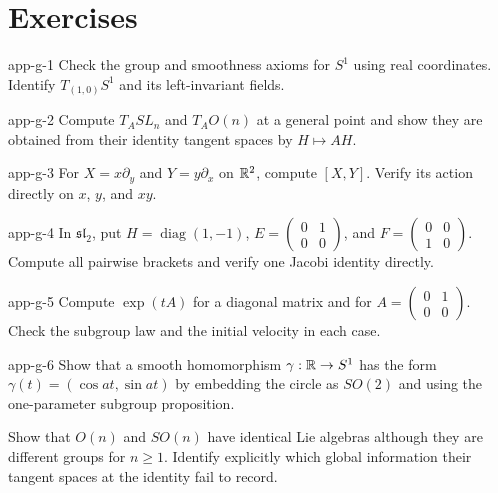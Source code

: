 \section*{Exercises}
\begin{hexercise}{app-g-1}
Check the group and smoothness axioms for $S^1$ using real coordinates.
Identify $T_{(1,0)}S^1$ and its left-invariant fields.
\end{hexercise}
\begin{hexercise}{app-g-2}
Compute $T_ASL_n$ and $T_AO(n)$ at a general point and show they are
obtained from their identity tangent spaces by $H\mapsto AH$.
\end{hexercise}
\begin{hexercise}{app-g-3}
For $X=x\partial_y$ and $Y=y\partial_x$ on $\mathbb{R}^2$, compute $[X,Y]$.
Verify its action directly on $x$, $y$, and $xy$.
\end{hexercise}
\begin{hexercise}{app-g-4}
In $\mathfrak{sl}_2$, put $H=\operatorname{diag}(1,-1)$,
$E=\left(\begin{smallmatrix}0&1\\0&0\end{smallmatrix}\right)$, and
$F=\left(\begin{smallmatrix}0&0\\1&0\end{smallmatrix}\right)$.
Compute all pairwise brackets and verify one Jacobi identity directly.
\end{hexercise}
\begin{hexercise}{app-g-5}
Compute $\exp(tA)$ for a diagonal matrix and for
$A=\left(\begin{smallmatrix}0&1\\0&0\end{smallmatrix}\right)$.
Check the subgroup law and the initial velocity in each case.
\end{hexercise}
\begin{hexercise}{app-g-6}
Show that a smooth homomorphism $\gamma:\mathbb{R}\to S^1$ has the form
$\gamma(t)=(\cos at,\sin at)$ by embedding the circle as $SO(2)$ and
using the one-parameter subgroup proposition.
\end{hexercise}
\begin{exercise}
Show that $O(n)$ and $SO(n)$ have identical Lie algebras although they
are different groups for $n\geq1$. Identify explicitly which global
information their tangent spaces at the identity fail to record.
\end{exercise}
